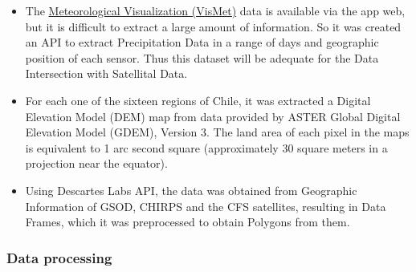 \documentclass[sigconf, nonacm]{acmart}
\begin{document}
\begin{itemize}
    \item The \href{http://vismet.cr2.cl}{Meteorological Visualization (VisMet)}  data is available via the app web, but it is difficult to extract a large amount of information. So it was created an API to extract Precipitation Data in a range of days and geographic position of each sensor. Thus this dataset will be adequate for the Data Intersection with Satellital Data.
    
    \item For each one of the sixteen regions of Chile, it was extracted a Digital Elevation Model (DEM) map from data provided by ASTER Global Digital Elevation Model (GDEM), Version 3. The land area of each pixel in the maps is equivalent to 1 arc second square (approximately 30 square meters in a projection near the equator). 
    
    \item Using Descartes Labs API, the data was obtained from Geographic Information of GSOD, CHIRPS and the CFS satellites, resulting in Data Frames, which it was preprocessed to obtain Polygons from them. %
    
    
\end{itemize}
\subsubsection{Data processing}

\noindent
    
\end{document}

